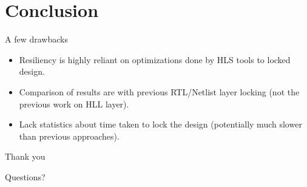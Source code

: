 \documentclass[xcolor=dvipsnames]{beamer}
\begin{document}
    \section{Conclusion}
    \begin{frame}{A few drawbacks}
        
        \begin{itemize}
            \item Resiliency is highly reliant on optimizations done by HLS tools to locked design. 
            \item Comparison of results are with previous RTL/Netlist layer locking (not the previous work on HLL layer).
            \item Lack statistics about time taken to lock the design (potentially much slower than previous approaches).
        \end{itemize}

    \end{frame}

    \begin{frame}{Thank you}

        Questions?
        
    \end{frame}
\end{document}
